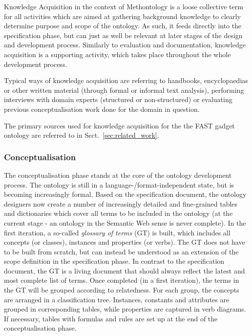 \documentclass{article}
\begin{document}
Knowledge Acquisition in the context of Methontology is a loose collective term for all activities which are aimed at gathering background knowledge to clearly determine purpose and scope of the ontology. As such, it feeds directly into the specification phase, but can just as well be relevant at later stages of the design and development process. Similarly to evaluation and documentation, knowledge acquisition is a supporting activity, which takes place throughout the whole development process.

Typical ways of knowledge acquisition are referring to handbooks, encyclopaedias or other written material (through formal or informal text analysis), performing interviews with domain experts (structured or non-structured) or evaluating previous conceptualisation work done for the domain in question.

The primary sources used for knowledge acquisition for the the FAST gadget ontology are referred to in Sect.~\ref{sec:related_work}.

\subsubsection{Conceptualisation} %
\label{ssub:conceptualisation}

The conceptualisation phase stands at the core of the ontology development process. The ontology is still in a language-/format-independent state, but is becoming increasingly formal. Based on the specification document, the ontology designers now create a number of increasingly detailed and fine-grained tables and dictionaries which cover all terms to be included in the ontology (at the current stage - an ontology in the Semantic Web sense is never complete). In the first iteration, a so-called \emph{glossary of terms} (GT) is built, which includes all concepts (or classes), instances and properties (or verbs). The GT does not have to be built from scratch, but can instead be understood as an extension of the scope definition in the specification phase.  In contrast to the specification document, the GT is a living document that should always reflect the latest and most complete list of terms. Once completed (in a first iteration), the terms in the GT will be grouped according to relatedness. For each group, the concepts are arranged in a classification tree. Instances, constants and attributes are grouped in corresponding tables, while properties are captured in verb diagrams. If necessary, tables with formulas and rules are set up at the end of the conceptualisation phase.
\end{document}
